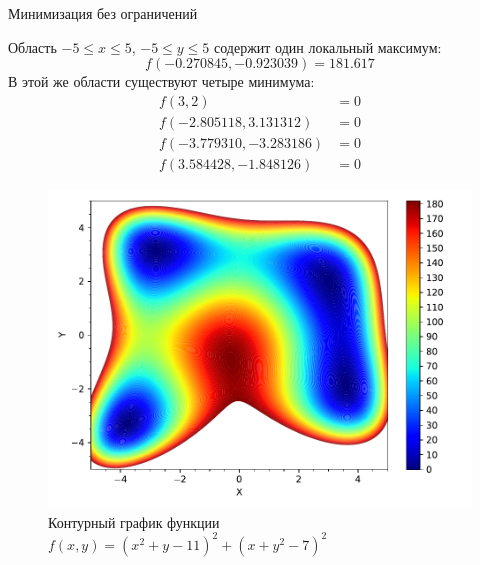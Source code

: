 \documentclass[aspectratio=169, mathserif]{beamer}	%
\begin{document}
\begin{frame}[fragile]{Минимизация без ограничений}
\scriptsize
\begin{minipage}{.4\textwidth}
Область $-5 \leqslant x \leqslant 5$, $-5 \leqslant y \leqslant 5$ содержит один локальный максимум:
\vfill
$$
	f\left(-0.270845, -0.923039\right) = 181.617
$$
\vfill
В этой же области существуют четыре минимума:
\vfill
\begin{equation*}
\begin{aligned}
	f\left(3, 2\right) &= 0 \\
	f\left(-2.805118, 3.131312\right) &= 0 \\
	f\left(-3.779310, -3.283186\right) &= 0 \\
	f\left(3.584428, -1.848126\right) &= 0
\end{aligned}
\end{equation*}
\vfill
\end{minipage}
\begin{minipage}{.59\textwidth}
\begin{figure}[h!]
\includegraphics[width=\textwidth]{./pics/contour2}
\caption{Контурный график функции $f\left(x, y\right) = \left(x^2 + y - 11\right)^2 + \left(x + y^2 - 7\right)^2$}
\end{figure}
\end{minipage}
\vfill
\end{frame}
\end{document}
